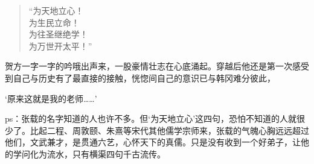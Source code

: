 \begin{quote}
“为天地立心！\\

为生民立命！\\

为往圣继绝学！\\

为万世开太平！”

\end{quote}

贺方一字一字的吟哦出声来，一股豪情壮志在心底涌起。穿越后他还是第一次感受到自己与历史有了最直接的接触，恍惚间自己的意识已与韩冈难分彼此，

‘原来这就是我的老师……’

ps：张载的名字知道的人也许不多。但‘为天地立心’这四句，恐怕不知道的人就很少了。比起二程、周敦颐、朱熹等宋代其他儒学宗师来，张载的气魄心胸远远超过他们，文武兼才，是贯通六艺，心怀天下的真儒。只是没有收到一个好弟子，让他的学问化为流水，只有横渠四句千古流传。

